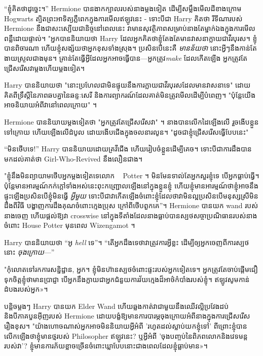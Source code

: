{{{{{“ខ្ញុំ​គិត​ថា​ដូច្នេះ។” Hermione បានងាកក្បាលរបស់នាងម្តងទៀត ដើម្បីសម្លឹងមើលដីខាងក្រោម Hogwarts ត្បិតព្រះអាទិត្យភ្លឺពេកក្នុងការមើលឥឡូវនេះ - ទោះបីជា Harry គិតថា រីទីណារបស់ Hermione នឹងជាសះស្បើយជានិច្ចនៅពេលនេះ វាមានសុវត្ថិភាពសម្រាប់នាងតែម្នាក់ឯងក្នុងការមើលពន្លឺដោយផ្ទាល់។ "អ្នកបាននិយាយថា Harry ដែលអ្នកគិតថាខ្ញុំតែងតែមានវាសនាក្លាយជាវីរបុរស។ ខ្ញុំបានពិចារណា ហើយខ្ញុំសង្ស័យថាអ្នកខុសទាំងស្រុង។ ប្រសិនបើនេះគឺ \emph{មានន័យថា} នោះអ្វីៗនឹងកាន់តែងាយស្រួលជាងមុន។ គ្រាន់តែធ្វើអ្វីដែលអ្នកអាចធ្វើបាន—អ្នកត្រូវ\emph{make} ដែលកើតឡើង អ្នកត្រូវតែជ្រើសរើសវាម្តងហើយម្តងទៀត។

Harry បាននិយាយថា "នោះប្រហែលជាមិនផ្ទុយនឹងការក្លាយជាវីរបុរសដែលមានវាសនាទេ" ដោយគិតពីទ្រឹស្តីនៃភាពឆបគ្នានៃឆន្ទៈសេរី និងការព្យាករណ៍ដែលគាត់មិនត្រូវមើលដើម្បីបំពេញ។ "ប៉ុន្តែយើងអាចនិយាយអំពីវានៅពេលក្រោយ" ។

Hermione បាននិយាយម្តងទៀតថា "អ្នកត្រូវតែជ្រើសរើសវា" ។ នាង​បាន​លើក​ដៃ​ឡើង​លើ រួច​ងើប​ខ្លួន​ទៅ​ក្រោយ ហើយ​ឡើង​លើ​ដំបូល ដោយ​ងើប​ជើង​ក្នុង​ចលនា​រលូន។ "ដូចជាខ្ញុំជ្រើសរើសធ្វើបែបនេះ"

“មិនថើបទេ!” Harry បាននិយាយដោយគ្រវីជើង ហើយរៀបចំខ្លួនដើម្បីគេច។ ទោះបីជាការដឹងបានមកដល់គាត់ថា Girl-Who-Revived នឹងលឿនជាង។

"ខ្ញុំនឹងមិនព្យាយាមថើបអ្នកម្តងទៀតទេលោក ~ Potter ។ មិនមែនទាល់តែអ្នកសួរខ្ញុំទេ បើអ្នកធ្លាប់ធ្វើ។ ប៉ុន្តែ​មាន​អារម្មណ៍​កក់ក្ដៅ​ទាំង​អស់​នេះ​ពុះកញ្ជ្រោល​ឡើង​នៅ​ក្នុង​ខ្លួន​ខ្ញុំ ហើយ​ខ្ញុំ​មាន​អារម្មណ៍​ថា​ខ្ញុំ​អាច​នឹង​ផ្ទុះ​ឡើង​ប្រសិន​បើ​ខ្ញុំ​មិន​ធ្វើ \emph{អ្វីមួយ} ទោះបីជា​វា​កើតឡើង​ចំពោះ​ខ្ញុំ​ដែល​ថា​វា​មិន​ល្អ​ប្រសិនបើ​មនុស្ស​ស្រី​មិន​ដឹង​ពី​វិធី បង្ហាញការដឹងគុណចំពោះក្មេងប្រុស ក្រៅពីថើបពួកគេ”។ Hermione បានយក wand របស់នាងចេញ ហើយផ្តល់ឱ្យវា crosswise នៅក្នុងទីតាំងដែលនាងធ្លាប់បានស្បថសច្ចាប្រណិធានរបស់នាងចំពោះ House Potter មុនពេល Wizengamot ។

Harry បាននិយាយថា “អូ \emph{hell} ទេ”។ “តើអ្នកដឹងទេថាវាត្រូវការអ្វីខ្លះ ដើម្បីឲ្យអ្នកចេញពីការស្បថនោះ \emph{ចុងក្រោយ}—”

"កុំលោតទៅរកការសន្និដ្ឋាន, អ្នក។ ខ្ញុំ​មិន​ហ៊ាន​ស្បថ​ចំពោះ​ផ្ទះ​របស់​អ្នក​ទៀត​ទេ។ អ្នក​ត្រូវ​តែ​ចាប់​ផ្ដើម​ជឿ​ទុក​ចិត្ត​ខ្ញុំ​ថា​មាន​ប្រាជ្ញា បើ​អ្នក​នឹង​ក្លាយ​ជា​អ្នក​ជំនួយ​ការ​វ័យ​ក្មេង​ដ៏​អាថ៌កំបាំង​របស់​ខ្ញុំ។ ឥឡូវ​សូម​កាន់​ដំបង​របស់​អ្នក»។

បន្តិចម្ដងៗ Harry បានយក Elder Wand ហើយឆ្លងកាត់វាជាមួយនឹងឈើវល្លិប្រវែងដប់និងបីភាគបួនអ៊ីញរបស់ Hermione ដោយបង្ខំឱ្យមានការបារម្ភចុងក្រោយអំពីនាងក្នុងការជ្រើសរើសរឿងខុស។ "យ៉ាងហោចណាស់អ្នកអាចមិននិយាយអ្វីអំពី 'រហូតដល់ស្លាប់យកខ្ញុំទៅ' ពីព្រោះខ្ញុំបានលើកឡើងថាខ្ញុំមានថ្មរបស់ Philosopher ឥឡូវនេះ? ឬអ្វីអំពី 'ចុងបញ្ចប់នៃពិភពលោកនិងវេទមន្តរបស់វា'? ខ្ញុំ​មាន​ការ​ភ័យ​ខ្លាច​ច្រើន​ចំពោះ​ឃ្លា​បែប​នោះ​ជាង​ពេល​ដែល​ខ្ញុំ​ធ្លាប់​មាន»។

}}}}}
